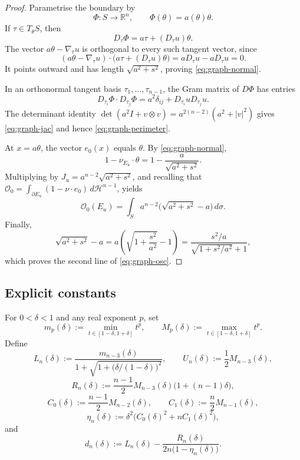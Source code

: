 \documentclass[11pt]{amsart}
\theoremstyle{definition}
\newcommand{\R}{\mathbb R}
\newcommand{\Hn}{\mathcal H^{n-1}}
\newcommand{\osc}{\mathcal O}
\begin{document}
\begin{proof}
Parametrise the boundary by
\[
   \Phi:S\to\R^n,\qquad \Phi(\theta)=a(\theta)\theta.
\]
If \(\tau\in T_\theta S\), then
\[
   D_\tau\Phi=a\tau+(D_\tau u)\theta.
\]
The vector \(a\theta-\nabla_\tau u\) is orthogonal to every such tangent
vector, since
\[
   (a\theta-\nabla_\tau u)\cdot
   \bigl(a\tau+(D_\tau u)\theta\bigr)
   =aD_\tau u-aD_\tau u=0.
\]
It points outward and has length \(\sqrt{a^2+s^2}\), proving
\eqref{eq:graph-normal}.

In an orthonormal tangent basis \(\tau_1,\ldots,\tau_{n-1}\), the Gram matrix
of \(D\Phi\) has entries
\[
   D_{\tau_i}\Phi\cdot D_{\tau_j}\Phi
   =a^2\delta_{ij}+D_{\tau_i}uD_{\tau_j}u.
\]
The determinant identity
\(\det(a^2I+v\otimes v)=a^{2(n-2)}(a^2+|v|^2)\) gives
\eqref{eq:graph-jac} and hence \eqref{eq:graph-perimeter}.

At \(x=a\theta\), the vector \(e_0(x)\) equals \(\theta\).  By
\eqref{eq:graph-normal},
\[
   1-\nu_{E_u}\cdot\theta
   =1-\frac{a}{\sqrt{a^2+s^2}}.
\]
Multiplying by \(J_u=a^{n-2}\sqrt{a^2+s^2}\), and recalling that
\(\osc_0=\int_{\partial E_u}(1-\nu\cdot e_0)\,d\Hn\), yields
\[
   \osc_0(E_u)
   =\int_Sa^{n-2}\bigl(\sqrt{a^2+s^2}-a\bigr)\,d\sigma.
\]
Finally,
\[
   \sqrt{a^2+s^2}-a
   =a\left(\sqrt{1+\frac{s^2}{a^2}}-1\right)
   =\frac{s^2/a}{\sqrt{1+s^2/a^2}+1},
\]
which proves the second line of \eqref{eq:graph-osc}.
\end{proof}

\subsection{Explicit constants}

For \(0<\delta<1\) and any real exponent \(p\), set
\[
   m_p(\delta):=\min_{t\in[1-\delta,1+\delta]}t^p,\qquad
   M_p(\delta):=\max_{t\in[1-\delta,1+\delta]}t^p.
\tag{3.11}\label{eq:mM}
\]
Define
\[
   L_n(\delta):=
   \frac{m_{n-3}(\delta)}
        {1+\sqrt{1+\bigl(\delta/(1-\delta)\bigr)^2}},
   \qquad
   U_n(\delta):=\frac12M_{n-3}(\delta),
\tag{3.12}\label{eq:LU}
\]
\[
   R_n(\delta):=
   \frac{n-1}{2}M_{n-3}(\delta)\bigl(1+(n-1)\delta\bigr),
\tag{3.13}\label{eq:R}
\]
\[
   C_0(\delta):=\frac{n-1}{2}M_{n-2}(\delta),\qquad
   C_1(\delta):=\frac n2M_{n-1}(\delta),
\tag{3.14}\label{eq:C01}
\]
\[
   \eta_n(\delta):=
   \delta^2\bigl(C_0(\delta)^2+nC_1(\delta)^2\bigr),
\tag{3.15}\label{eq:eta}
\]
and
\[
   d_n(\delta):=
   L_n(\delta)-\frac{R_n(\delta)}
   {2n\bigl(1-\eta_n(\delta)\bigr)}.
\tag{3.16}\label{eq:dn}
\]
\end{document}
